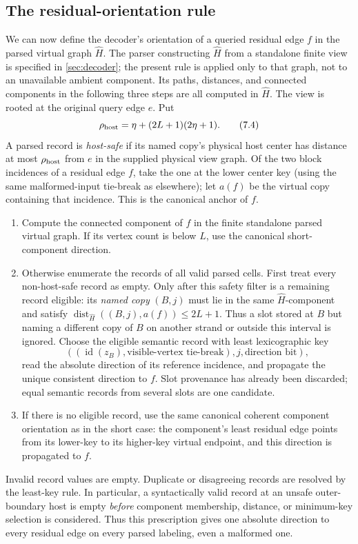 \documentclass[11pt]{article}
\theoremstyle{definition}
\theoremstyle{remark}
\newcommand{\id}{\operatorname{id}}
\newcommand{\dist}{\operatorname{dist}}
\begin{document}
\subsection{The residual-orientation rule}
\label{sec:orientation-rule}

We can now define the decoder's orientation of a queried residual edge
$f$ in the parsed virtual graph $\widehat H$.  The parser constructing
$\widehat H$ from a standalone finite view is specified in
\cref{sec:decoder}; the present rule is applied only to that graph, not to
an unavailable ambient component.  Its paths, distances, and connected
components in the following three steps are all computed in $\widehat H$.
The view is rooted at the original query edge $e$.  Put
\[
 \rho_{\rm host}=\eta+(2L+1)(2\eta+1).                       \tag{7.4}
\]
A parsed record is \emph{host-safe} if its named copy's physical host center
has distance at most $\rho_{\rm host}$ from $e$ in the supplied physical
view graph.  Of the two block incidences of a residual edge $f$, take the
one at the lower center key (using the same malformed-input tie-break as
elsewhere); let $a(f)$ be the virtual copy containing that incidence.  This is
the canonical anchor of $f$.
\begin{enumerate}[label=\textbf{\arabic*.},leftmargin=2.3em]
\item Compute the connected component of $f$ in the finite standalone parsed
      virtual graph.  If its vertex count is below $L$, use the canonical
      short-component direction.
\item Otherwise enumerate the records of all valid parsed cells.
      First treat every non-host-safe record as empty.  Only
      after this safety filter is a remaining record eligible: its
      \emph{named copy} $(B,j)$ must lie in the same $\widehat H$-component and satisfy
      $\dist_{\widehat H}((B,j),a(f))\le2L+1$.  Thus a slot stored at $B$ but naming a
      different copy of $B$ on another strand or outside this interval is
      ignored.  Choose the eligible semantic record with least lexicographic
      key
      \[
       ((\id(z_B),\text{visible-vertex tie-break}),j,
          \text{direction bit}),
      \]
      read the absolute direction of its reference incidence, and propagate
      the unique consistent direction to $f$.  Slot provenance has already
      been discarded; equal semantic records from several slots are one
      candidate.
\item If there is no eligible record, use the same canonical coherent
      component orientation as in the short case: the component's least
      residual edge points from its lower-key to its higher-key virtual
      endpoint, and this direction is propagated to $f$.
\end{enumerate}
Invalid record values are empty.  Duplicate or disagreeing records are
resolved by the least-key rule.  In particular, a syntactically valid record
at an unsafe outer-boundary host is empty \emph{before} component membership,
distance, or minimum-key selection is considered.  Thus this prescription
gives one absolute direction to every residual edge on every parsed labeling,
even a malformed one.
\end{document}
